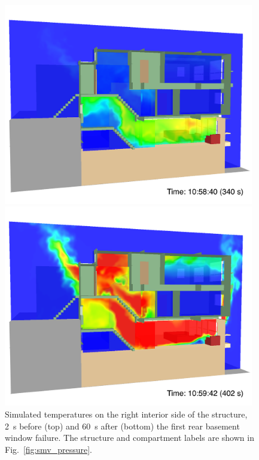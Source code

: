 \documentclass[12pt,oneside]{book}
\begin{document}
\begin{figure}[!ht]
\includegraphics[width=4.3in]{../Figures/SMV_Temp_340_s}


\includegraphics[width=4.3in]{../Figures/SMV_Temp_402_s}


\caption[Simulated temperatures on the right interior side of the structure.]
{Simulated temperatures on the right interior side of the structure, 2~s before (top) and 60~s after (bottom) the first rear basement window failure. The structure and compartment labels are shown in Fig.~\ref{fig:smv_pressure}.}
\label{fig:smv_temperature}
\end{figure}


\clearpage
\end{document}
